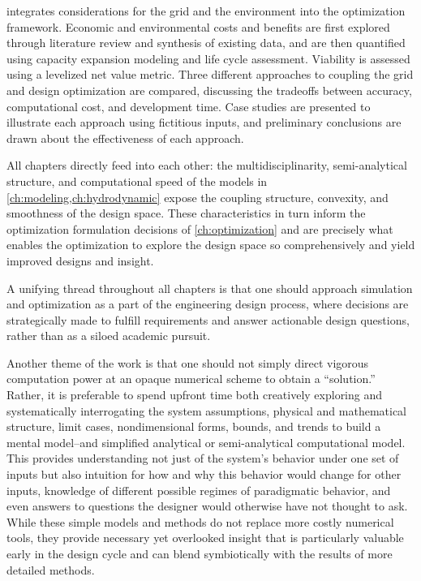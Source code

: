 \ifdefined\DECIDER
     integrates considerations for the grid and the environment into the optimization framework.
    Economic and environmental costs and benefits are first explored through literature review and synthesis of existing data,
    and are then quantified using capacity expansion modeling and life cycle assessment.
    Viability is assessed using a levelized net value metric.
    Three different approaches to coupling the grid and design optimization are compared,
    discussing the tradeoffs between accuracy, computational cost, and development time.
    Case studies are presented to illustrate each approach using fictitious inputs,
    and preliminary conclusions are drawn about the effectiveness of each approach.
\fi

All chapters directly feed into each other:
the multidisciplinarity, semi-analytical structure, and computational speed of the models in \cref{ch:modeling,ch:hydrodynamic} expose the 
coupling structure, convexity, and smoothness of the design space.
These characteristics in turn inform the optimization formulation decisions of \cref{ch:optimization} and are precisely what enables the optimization to explore the design space so comprehensively and yield improved designs and insight.

A unifying thread throughout all chapters is that one should approach simulation and optimization as a part of the engineering design process,
where decisions are strategically made to fulfill requirements and answer actionable design questions, rather than as a siloed academic pursuit.

Another theme of the work is that one should not simply direct vigorous computation power at an opaque numerical scheme to obtain a ``solution.''
Rather, it is preferable to spend upfront time both creatively exploring and systematically interrogating the system assumptions, physical and mathematical structure, limit cases, nondimensional forms, bounds, and trends to build a mental model--and simplified analytical or semi-analytical computational model.
This provides understanding not just of the system's behavior under one set of inputs but also intuition for how and why this behavior would change for other inputs, knowledge of different possible regimes of paradigmatic behavior, and even answers to questions the designer would otherwise have not thought to ask.
While these simple models and methods do not replace more costly numerical tools, they provide necessary yet overlooked insight that is particularly valuable early in the design cycle and can blend symbiotically with the results of more detailed methods.

